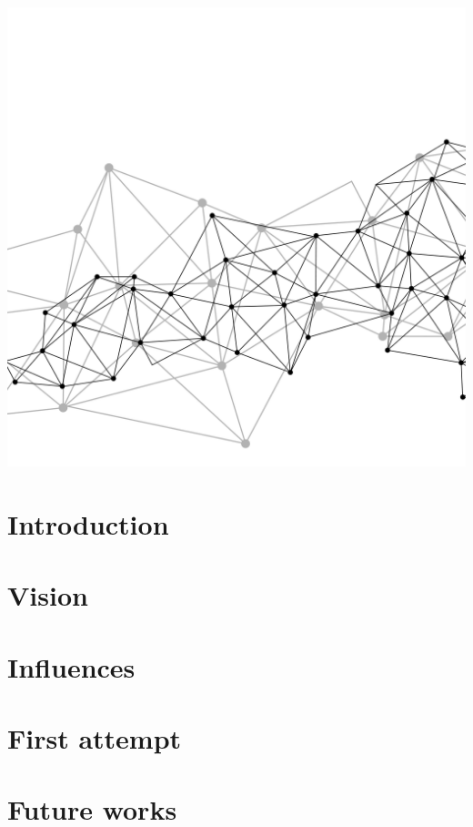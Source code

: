\documentclass[9pt, aspectratio=169]{beamer}
\begin{document}
  \begin{frame}[plain] \begin{backgroundblock} 
    \includegraphics[width=\paperwidth]{img/main-background.jpg} 
  \end{backgroundblock} 
  \titlepage 
\end{frame}
\section{Introduction}

\section{Vision}

\section{Influences}

\section{First attempt}

\section{Future works}

\end{document}
